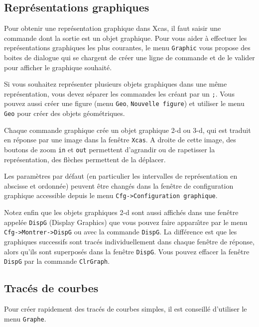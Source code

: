 \documentclass{article}
\begin{document}
\begin{giacjshere}
\section{Repr\'esentations graphiques}
%
Pour obtenir une repr\'esentation graphique dans Xcas, il faut saisir une commande
dont la sortie est un objet graphique.
Pour vous aider \`a effectuer les repr\'esentations graphiques les plus courantes,
le menu \verb|Graphic| vous propose des boites de dialogue qui se chargent
de cr\'eer une ligne de commande et de le valider pour afficher le graphique souhait\'e.

Si vous souhaitez repr\'esenter plusieurs objets graphiques dans une m\^eme repr\'esentation,
vous devez s\'eparer les commandes les cr\'eant par un \verb|;|. Vous pouvez aussi cr\'eer
une figure (menu \verb|Geo|, \verb|Nouvelle figure|) et utiliser le menu \verb|Geo|
pour cr\'eer des objets g\'eom\'etriques.

Chaque commande graphique cr\'ee un objet graphique 2-d ou 3-d, qui est traduit
en r\'eponse par une image dans la fen\^etre {\tt Xcas}. A droite de cette
image, des boutons de zoom \verb|in| et \verb|out| permettent
d'agrandir ou de rapetisser la repr\'esentation, des fl\`eches
permettent de la d\'eplacer. 

Les param\`etres par d\'efaut (en
particulier les intervalles de repr\'esentation en abscisse et
ordonn\'ee) peuvent \^etre chang\'es dans la fen\^etre de configuration
graphique accessible depuis le menu
\verb|Cfg->Configuration graphique|.

Notez enfin que les objets graphiques 2-d sont 
aussi affich\'es dans une fen\^etre appel\'ee
\verb|DispG| (Display Graphics) que vous pouvez faire appara\^\i tre par le 
menu
\verb|Cfg->Montrer->DispG| ou avec la commande 
\verb|DispG|. La diff\'erence est que les graphiques successifs sont trac\'es
individuellement dans chaque fen\^etre de r\'eponse, alors qu'ils sont
superpos\'es dans la fen\^etre \verb|DispG|. Vous pouvez effacer la
fen\^etre \verb|DispG| par la commande \verb|ClrGraph|.

\subsection{Trac\'es de courbes}
%
Pour cr\'eer rapidement des trac\'es de courbes simples, 
il est conseill\'e d'utiliser le menu \verb|Graphe|.


\end{giacjshere}
\end{document}
